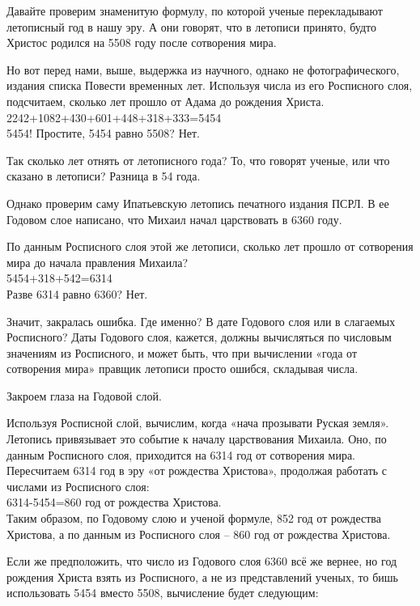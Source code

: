 Давайте проверим знаменитую формулу, по которой ученые перекладывают летописный год в нашу эру. А они говорят, что в летописи принято, будто Христос родился на 5508 году после сотворения мира.

Но вот перед нами, выше, выдержка из научного, однако не фотографического, издания списка Повести временных лет. Используя числа из его Росписного слоя, подсчитаем, сколько лет прошло от Адама до рождения Христа.\\

2242+1082+430+601+448+318+333=5454\\

5454! Простите, 5454 равно 5508? Нет. 

Так сколько лет отнять от летописного года? То, что говорят ученые, или что сказано в летописи? Разница в 54 года.

Однако проверим саму Ипатьевскую летопись печатного издания ПСРЛ. В ее Годовом слое написано, что Михаил начал царствовать в 6360 году.

По данным Росписного слоя этой же летописи, сколько лет прошло от сотворения мира до начала правления Михаила?\\

5454+318+542=6314\\

Разве 6314 равно 6360? Нет. 

Значит, закралась ошибка. Где именно? В дате Годового слоя или в слагаемых Росписного? Даты Годового слоя, кажется, должны вычисляться по числовым значениям из Росписного, и может быть, что при вычислении «года от сотворения мира» правщик летописи просто ошибся, складывая числа.

Закроем глаза на Годовой слой. 

Используя Росписной слой, вычислим, когда «нача прозывати Руская земля». Летопись привязывает это событие к началу царствования Михаила. Оно, по данным Росписного слоя, приходится на 6314 год от сотворения мира. Пересчитаем 6314 год в эру «от рождества Христова», продолжая работать с числами из Росписного слоя:\\ 

6314-5454=860 год от рождества Христова.\\

Таким образом, по Годовому слою и ученой формуле, 852 год от рождества Христова, а по данным из Росписного слоя – 860 год от рождества Христова.

Если же предположить, что число из Годового слоя 6360 всё же вернее, но год рождения Христа взять из Росписного, а не из представлений ученых, то бишь использовать 5454 вместо 5508, вычисление будет следующим:\\

